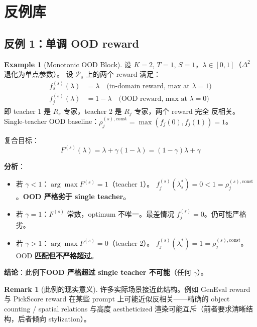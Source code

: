 \documentclass[11pt,a4paper]{article}
\newcommand{\const}{\mathrm{const}}
\theoremstyle{definition}
\newtheorem{remark}{Remark}
\newtheorem{example}{Example}
\begin{document}
\section{反例库}
\label{sec:counter}

\subsection{反例 1：单调 OOD reward}
\label{subsec:counter1}

\begin{example}[Monotonic OOD Block]
\label{ex:monotonic}
设 $K = 2$, $T = 1$, $S = 1$，$\lambda \in [0, 1]$（$\Delta^2$ 退化为单点参数）。
设 $\mathcal{P}_s$ 上的两个 reward 满足：
\begin{align}
f_s^{(s)}(\lambda) &= \lambda \quad\text{(in-domain reward, max at } \lambda = 1\text{)}\\
f_j^{(s)}(\lambda) &= 1 - \lambda \quad\text{(OOD reward, max at } \lambda = 0\text{)}
\end{align}
即 teacher 1 是 $R_s$ 专家，teacher 2 是 $R_j$ 专家，两个 reward 完全
反相关。Single-teacher OOD baseline：$\rho_j^{(s),\const} = \max(f_j(0), f_j(1)) = 1$。

复合目标：
\begin{equation}
F^{(s)}(\lambda) = \lambda + \gamma(1 - \lambda) = (1 - \gamma)\lambda + \gamma
\end{equation}

\textbf{分析}：
\begin{itemize}[leftmargin=1.5em]
\item 若 $\gamma < 1$：$\arg\max F^{(s)} = 1$（teacher 1）。
$f_j^{(s)}(\lambda_s^*) = 0 < 1 = \rho_j^{(s),\const}$。\textbf{OOD 严格劣于 single teacher}。
\item 若 $\gamma = 1$：$F^{(s)}$ 常数，optimum 不唯一。最差情况
$f_j^{(s)} = 0$。仍可能严格劣。
\item 若 $\gamma > 1$：$\arg\max F^{(s)} = 0$（teacher 2）。
$f_j^{(s)}(\lambda_s^*) = 1 = \rho_j^{(s),\const}$。OOD \textbf{匹配但不严格超过}。
\end{itemize}

\textbf{结论}：此例下\textbf{OOD 严格超过 single teacher 不可能}（任何 $\gamma$）。
\end{example}

\begin{remark}[此例的现实意义]
许多实际场景接近此结构。例如 GenEval reward 与 PickScore reward 在某些
prompt 上可能近似反相关——精确的 object counting / spatial relations 与高度
aestheticized 渲染可能互斥（前者要求清晰结构，后者倾向 stylization）。
\end{remark}
\end{document}
